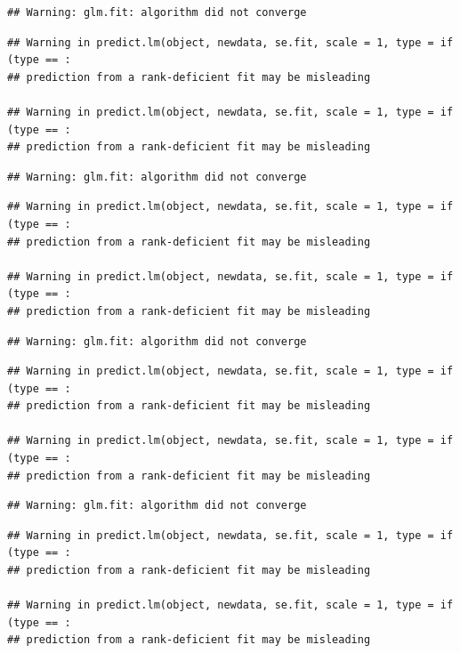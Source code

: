 \documentclass[
  english,
  man]{apa6}
\begin{document}
\begin{verbatim}
## Warning: glm.fit: algorithm did not converge
\end{verbatim}

\begin{verbatim}
## Warning in predict.lm(object, newdata, se.fit, scale = 1, type = if (type == :
## prediction from a rank-deficient fit may be misleading

## Warning in predict.lm(object, newdata, se.fit, scale = 1, type = if (type == :
## prediction from a rank-deficient fit may be misleading
\end{verbatim}

\begin{verbatim}
## Warning: glm.fit: algorithm did not converge
\end{verbatim}

\begin{verbatim}
## Warning in predict.lm(object, newdata, se.fit, scale = 1, type = if (type == :
## prediction from a rank-deficient fit may be misleading

## Warning in predict.lm(object, newdata, se.fit, scale = 1, type = if (type == :
## prediction from a rank-deficient fit may be misleading
\end{verbatim}

\begin{verbatim}
## Warning: glm.fit: algorithm did not converge
\end{verbatim}

\begin{verbatim}
## Warning in predict.lm(object, newdata, se.fit, scale = 1, type = if (type == :
## prediction from a rank-deficient fit may be misleading

## Warning in predict.lm(object, newdata, se.fit, scale = 1, type = if (type == :
## prediction from a rank-deficient fit may be misleading
\end{verbatim}

\begin{verbatim}
## Warning: glm.fit: algorithm did not converge
\end{verbatim}

\begin{verbatim}
## Warning in predict.lm(object, newdata, se.fit, scale = 1, type = if (type == :
## prediction from a rank-deficient fit may be misleading

## Warning in predict.lm(object, newdata, se.fit, scale = 1, type = if (type == :
## prediction from a rank-deficient fit may be misleading
\end{verbatim}
\end{document}
